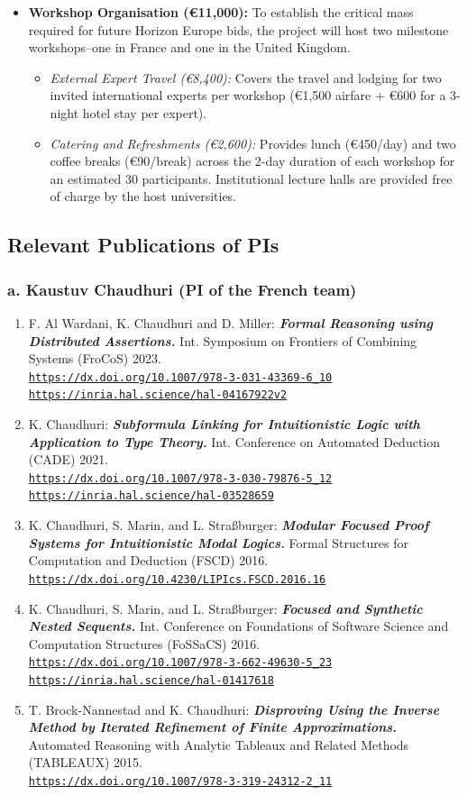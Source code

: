 \documentclass[a4paper]{article}
\def\myperiod{.}
\def\halwebref#1{\href{https://inria.hal.science/hal-#1}%
     {{https://inria.hal.science/hal-#1}}}
\def\webref#1{\href{#1}%
     {{#1}}}
\newcommand{\copubsitemref}[4]{
  \item#1:
  {\def\bfdefault{bx}\bf\emph{#2\myperiod}} #3.
  \\{\small\tt\webref{#4}}
}
\newcommand{\copubsitemfullref}[5]{
  \item#1:
  {\def\bfdefault{bx}\bf\emph{#2\myperiod}} #3.
  \\{\small\tt\webref{#4}}
  \\{\small\tt\halwebref{#5}}
}
\begin{document}
\begin{itemize}
    \item \textbf{Workshop Organisation (\euro 11,000):} To establish the critical mass required for future Horizon Europe bids, the project will host two milestone workshops--one in France and one in the United Kingdom.
    \begin{itemize}
        \item \textit{External Expert Travel (\euro 8,400):} Covers the travel and lodging for two invited international experts per workshop (\euro 1,500 airfare + \euro 600 for a 3-night hotel stay per expert).
        \item \textit{Catering and Refreshments (\euro 2,600):} Provides lunch (\euro 450/day) and two coffee breaks (\euro 90/break) across the 2-day duration of each workshop for an estimated 30 participants. Institutional lecture halls are provided free of charge by the host universities.
    \end{itemize}
\end{itemize}

\subsection*{Relevant Publications of PIs}

\subsubsection*{a. Kaustuv Chaudhuri (PI of the French team)}

\begin{enumerate}[noitemsep]

\copubsitemfullref{F. Al Wardani, K. Chaudhuri and D. Miller}{Formal Reasoning using Distributed Assertions}{Int. Symposium on Frontiers of Combining Systems (FroCoS) 2023}{https://dx.doi.org/10.1007/978-3-031-43369-6\_10}{04167922v2}\label{ref:damf}

\copubsitemfullref{K. Chaudhuri}{Subformula Linking for Intuitionistic Logic with Application to Type Theory}{Int. Conference on Automated Deduction (CADE) 2021}{https://dx.doi.org/10.1007/978-3-030-79876-5\_12}{03528659}\label{ref:linking}

\copubsitemref{K. Chaudhuri, S. Marin, and L. Straßburger}{Modular Focused Proof Systems for Intuitionistic Modal Logics}{Formal Structures for Computation and Deduction (FSCD) 2016}{https://dx.doi.org/10.4230/LIPIcs.FSCD.2016.16}\label{ref:nested1}

\copubsitemfullref{K. Chaudhuri, S. Marin, and L. Straßburger}{Focused and Synthetic Nested Sequents}{Int. Conference on Foundations of Software Science and Computation Structures (FoSSaCS) 2016}{https://dx.doi.org/10.1007/978-3-662-49630-5\_23}{01417618}\label{ref:nested2}

\copubsitemref{T. Brock-Nannestad and K. Chaudhuri}{Disproving Using the Inverse Method by Iterated Refinement of Finite Approximations}{Automated Reasoning with Analytic Tableaux and Related Methods (TABLEAUX) 2015}{https://dx.doi.org/10.1007/978-3-319-24312-2\_11}\label{ref:maetning}

\end{enumerate}
\end{document}
